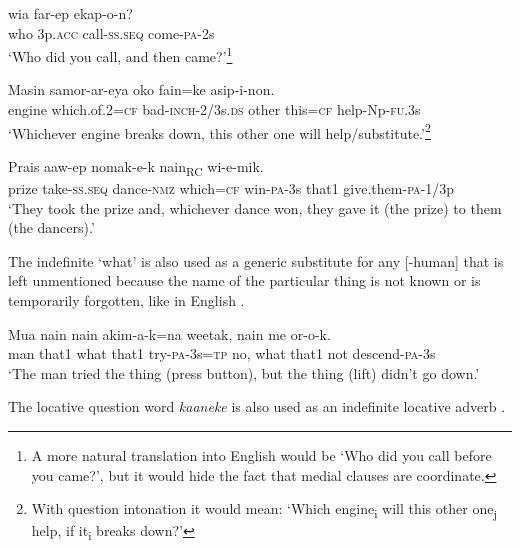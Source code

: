 \ea%
\label{ex:3:x643}
\gll {} wia far-ep ekap-o-n? \\
who 3p.\textsc{acc} call-\textsc{ss}.\textsc{seq} come-\textsc{pa}-2s\\
\glt`Who did you call, and then came?'\footnote{A more natural translation into English would be `Who did you call before you came?', but it would hide the fact that medial clauses are coordinate.}
\z

\ea%
\label{ex:3:x644}
\gll Masin  samor-ar-eya oko fain=ke asip-i-non.\\
engine which.of.2=\textsc{cf} bad-\textsc{inch}-2/3s.\textsc{ds} other this=\textsc{cf} help-Np-\textsc{fu}.3s\\
\glt`Whichever engine breaks down, this other one will help/substitute.'\footnote{With question intonation it would mean: `Which engine\textsubscript{i} will this other one\textsubscript{j} help, if it\textsubscript{i} breaks down?'}
\z

\ea%
\label{ex:3:x645}
\gll Prais aaw-ep {\ob}  nomak-e-k nain{\cb}\textsubscript{RC} wi-e-mik.\\
prize take-\textsc{ss}.\textsc{seq} dance-\textsc{nmz} which=\textsc{cf} win-\textsc{pa}-3s that1 give.them-\textsc{pa}-1/3p\\
\glt`They took the prize and, whichever dance won, they gave it (the prize) to them (the dancers).'
\z

The indefinite  `what' is also used as a generic substitute for any [\nobreakdash-human]  that is left unmentioned because the name of the particular thing is not known or is temporarily forgotten, like  in English . 

\ea%
\label{ex:3:x646}
\gll Mua nain  nain akim-a-k=na weetak,   nain me or-o-k.\\
man that1 what that1 try-\textsc{pa}-3s=\textsc{tp} no, what that1 not descend-\textsc{pa}-3s\\
\glt`The man tried the thing (press button), but the thing (lift) didn't go down.'
\z

The locative question word \textit{kaaneke} is also used as an indefinite locative adverb .

